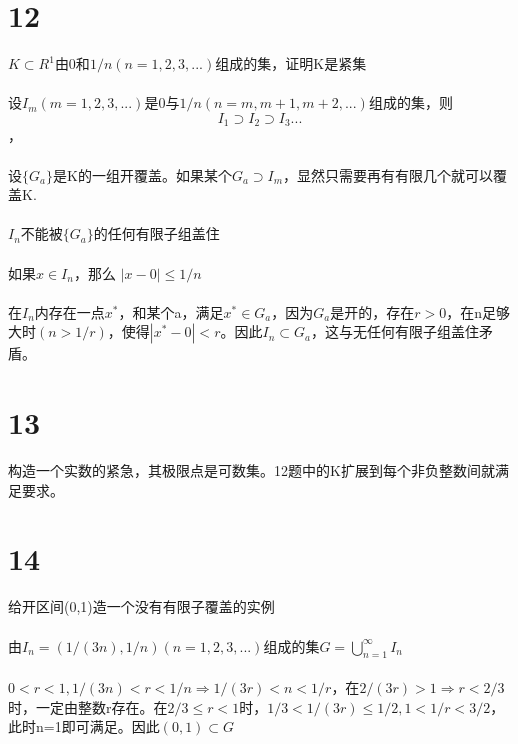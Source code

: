 \section*{12} $K \subset R^1 $由0和$1/n ( n = 1, 2, 3, ...)$组成的集，证明K是紧集
\paragraph{} 设$I_m (m=1, 2, 3, ...)$是0与$1/n (n = m, m+1, m+2, ...)$组成的集，则$$ I_1 \supset I_2 \supset I_3 ...$$，
\paragraph{} 设$\{ G_a\}$是K的一组开覆盖。如果某个$G_a \supset I_m$，显然只需要再有有限几个就可以覆盖K.
\paragraph{} $I_n$不能被$\{G_a\}$的任何有限子组盖住
\paragraph{} 如果$x \in I_n$，那么 $| x - 0 | \le 1/n$
\paragraph{} 在$I_n$内存在一点$x^*$，和某个a，满足$x^* \in G_a$，因为$G_a$是开的，存在$r > 0$，在n足够大时$( n > 1/r )$，使得$|x^* - 0| < r$。因此$I_n \subset G_a$，这与无任何有限子组盖住矛盾。
\section*{13} 构造一个实数的紧急，其极限点是可数集。12题中的K扩展到每个非负整数间就满足要求。
\section*{14} 给开区间(0,1)造一个没有有限子覆盖的实例
\paragraph{} 由$I_n = (1/(3n), 1/n) (n=1, 2, 3, ...)$组成的集$G = \bigcup_{n=1}^{\infty}{I_n}$
\paragraph{} $ 0 < r < 1 , 1/(3n) < r < 1/n \Rightarrow 1/(3r) < n < 1/r$，在$ 2/(3r) > 1 \Rightarrow r < 2/3 $时，一定由整数r存在。在$2/3 \le r < 1$时，$ 1/3 < 1/(3r) \le 1/2,  1 < 1/r < 3/2$，此时n=1即可满足。因此$(0,1) \subset G$
